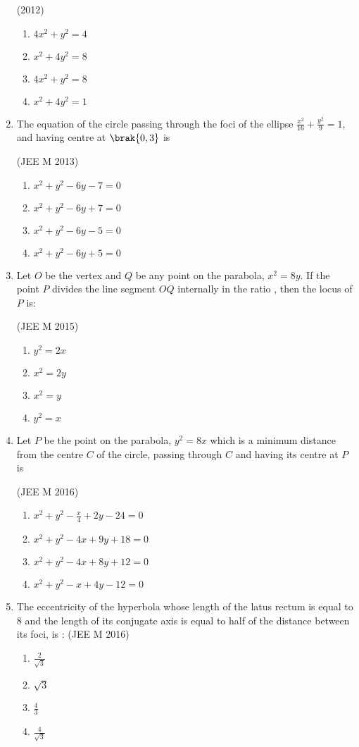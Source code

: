 \begin{enumerate}
\hfill(2012)
\begin{enumerate}
    \item $4x^2+y^2=4$ 
    \item $x^2+4y^2=8$
    \item $4x^2+y^2=8$
    \item $x^2+4y^2=1$
\end{enumerate}
\item The equation of the circle passing through the foci of the ellipse $\frac{x^2}{16}+\frac{y^2}{9}=1$, and having centre at $\brak{0,3}$ is

\hfill(JEE M 2013)
\begin{enumerate}
    \item $x^2+y^2-6y-7=0$
    \item $x^2+y^2-6y+7=0$
    \item $x^2+y^2-6y-5=0$
    \item $x^2+y^2-6y+5=0$
\end{enumerate}
\item Let $O$ be the vertex and $Q$ be any point on the parabola, $x^2=8y$. If the point $P$ divides the line segment $OQ$ internally in the ratio , then the locus of $P$ is:

\hfill(JEE M 2015)
\begin{enumerate}
    \item $y^2=2x$
    \item $x^2=2y$
    \item $x^2=y$
    \item $y^2=x$
\end{enumerate}
\item Let $P$ be the point on the parabola, $y^2=8x$ which is a minimum distance from the centre $C$ of the circle, passing through $C$ and having its centre at $P$ is

\hfill(JEE M 2016)
\begin{enumerate}
    \item $x^2+y^2-\frac{x}{4}+2y-24=0$ 
    \item $x^2+y^2-4x+9y+18=0$ 
    \item $x^2+y^2-4x+8y+12=0$
    \item $x^2+y^2-x+4y-12=0$
\end{enumerate}
\item The eccentricity of the hyperbola whose length of the latus rectum is equal to $8$ and the length of its conjugate axis is equal to half of the distance between its foci, is : 
\hfill(JEE M 2016)
\begin{enumerate}
    \item $\frac{2}{\sqrt{3}}$
    \item $\sqrt{3}$
    \item $\frac{4}{3}$
    \item $\frac{4}{\sqrt{3}}$
\end{enumerate}


\end{enumerate}
